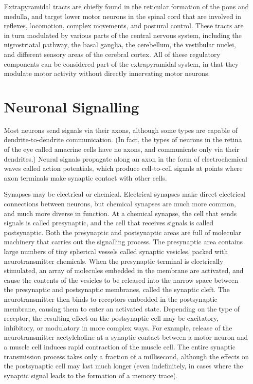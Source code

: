\documentclass[]{book}
\begin{document}
Extrapyramidal tracts are chiefly found in the reticular formation of the pons and medulla, and target lower motor neurons in the spinal cord that are involved in reflexes, locomotion, complex movements, and postural control. These tracts are in turn modulated by various parts of the central nervous system, including the nigrostriatal pathway, the basal ganglia, the cerebellum, the vestibular nuclei, and different sensory areas of the cerebral cortex. All of these regulatory components can be considered part of the extrapyramidal system, in that they modulate motor activity without directly innervating motor neurons.

\hypertarget{neuronal-signalling}{%
\section{Neuronal Signalling}\label{neuronal-signalling}}

Most neurons send signals via their axons, although some types are capable of dendrite-to-dendrite communication. (In fact, the types of neurons in the retina of the eye called amacrine cells have no axons, and communicate only via their dendrites.) Neural signals propagate along an axon in the form of electrochemical waves called action potentials, which produce cell-to-cell signals at points where axon terminals make synaptic contact with other cells.

Synapses may be electrical or chemical. Electrical synapses make direct electrical connections between neurons, but chemical synapses are much more common, and much more diverse in function. At a chemical synapse, the cell that sends signals is called presynaptic, and the cell that receives signals is called postsynaptic. Both the presynaptic and postsynaptic areas are full of molecular machinery that carries out the signalling process. The presynaptic area contains large numbers of tiny spherical vessels called synaptic vesicles, packed with neurotransmitter chemicals. When the presynaptic terminal is electrically stimulated, an array of molecules embedded in the membrane are activated, and cause the contents of the vesicles to be released into the narrow space between the presynaptic and postsynaptic membranes, called the synaptic cleft. The neurotransmitter then binds to receptors embedded in the postsynaptic membrane, causing them to enter an activated state. Depending on the type of receptor, the resulting effect on the postsynaptic cell may be excitatory, inhibitory, or modulatory in more complex ways. For example, release of the neurotransmitter acetylcholine at a synaptic contact between a motor neuron and a muscle cell induces rapid contraction of the muscle cell. The entire synaptic transmission process takes only a fraction of a millisecond, although the effects on the postsynaptic cell may last much longer (even indefinitely, in cases where the synaptic signal leads to the formation of a memory trace).
\end{document}
